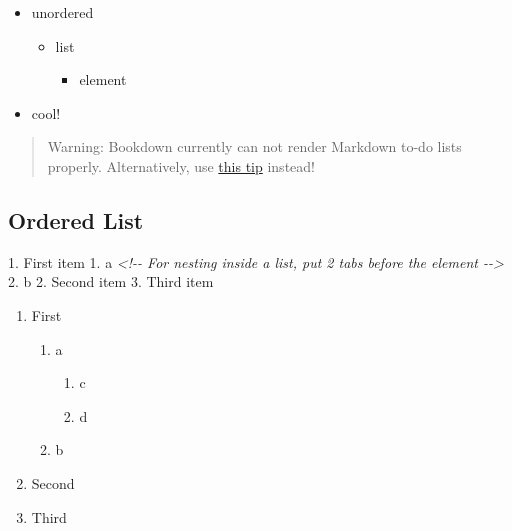 \documentclass[
]{book}
\newenvironment{Shaded}{\begin{snugshade}}{\end{snugshade}}
\newcommand{\CommentTok}[1]{\textcolor[rgb]{0.56,0.35,0.01}{\textit{#1}}}
\newcommand{\NormalTok}[1]{#1}
\newcommand{\SpecialStringTok}[1]{\textcolor[rgb]{0.31,0.60,0.02}{#1}}
\providecommand{\tightlist}{%
  \setlength{\itemsep}{0pt}\setlength{\parskip}{0pt}}
\theoremstyle{definition}
\theoremstyle{definition}
\theoremstyle{definition}
\theoremstyle{definition}
\theoremstyle{remark}
\begin{document}
\begin{itemize}
\tightlist
\item
  unordered

  \begin{itemize}
  \tightlist
  \item
    list

    \begin{itemize}
    \tightlist
    \item
      element
    \end{itemize}
  \end{itemize}
\item
  cool!
\end{itemize}

\begin{quote}
Warning: Bookdown currently can not render Markdown to-do lists properly. Alternatively, use \hyperref[use-html]{this tip} instead!
\end{quote}

\subsection*{Ordered List}\label{ordered-list}

\begin{Shaded}
\begin{Highlighting}[]
\SpecialStringTok{1. }\NormalTok{First item}
\SpecialStringTok{    1. }\NormalTok{a }\CommentTok{\textless{}!{-}{-} For nesting inside a list, put 2 tabs before the element {-}{-}\textgreater{}}
\SpecialStringTok{    2. }\NormalTok{b}
\SpecialStringTok{2. }\NormalTok{Second item}
\SpecialStringTok{3. }\NormalTok{Third item}
\end{Highlighting}
\end{Shaded}

\begin{enumerate}
\def\labelenumi{\arabic{enumi}.}
\tightlist
\item
  First

  \begin{enumerate}
  \def\labelenumii{\arabic{enumii}.}
  \tightlist
  \item
    a

    \begin{enumerate}
    \def\labelenumiii{\arabic{enumiii}.}
    \tightlist
    \item
      c
    \item
      d
    \end{enumerate}
  \item
    b
  \end{enumerate}
\item
  Second
\item
  Third
\end{enumerate}
\end{document}
